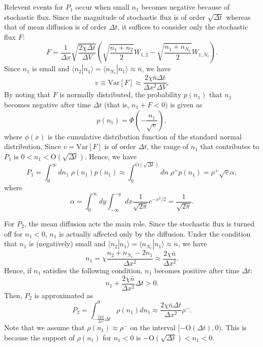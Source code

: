 \documentclass{article}
\begin{document}
Relevent events for $P_1$ occur when small $n_1$ becomes negative because of stochastic flux. 
Since the magnitude of stochastic flux is of order $\sqrt{\Delta t}$ whereas that of mean diffusion is of order $\Delta t$, it suffices to consider only the stochastic flux $F$:
\begin{equation}
F=\frac{1}{\Delta x}\sqrt{\frac{2\chi\Delta t}{\Delta V}}\left(\sqrt{\frac{n_1+n_2}{2}}W_{1,2}-\sqrt{\frac{n_1+n_{N_\mathrm{c}}}{2}}W_{1,N_\mathrm{c}}\right).
\end{equation}
Since $n_1$ is small and $\langle n_2|n_1\rangle = \langle n_{N_\mathrm{c}}|n_1\rangle \approx \bar{n}$, we have
\begin{equation}
v\equiv\mathrm{Var}[F] \approx \frac{2\chi\bar{n}\Delta t}{\Delta x^2\Delta V}.
\end{equation}
By noting that $F$ is normally distributed, the probability $p(n_1)$ that $n_1$ becomes negative after time $\Delta t$ (that is, $n_1+F<0$) is given as
\begin{equation}
p(n_1)=\Phi\left(-\frac{n_1}{\sqrt{v}}\right),
\end{equation}
where $\phi(x)$ is the cumulative distribution function of the standard normal distribution.
Since $v=\mathrm{Var}[F]$ is of order $\Delta t$, the range of $n_1$ that contributes to $P_1$ is $0<n_1<\mathrm{O}(\sqrt{\Delta t})$.
Hence, we have
\begin{equation}
\label{P1}
P_1 = \int_0^\infty dn_1\; \rho(n_1)p(n_1)\approx \int_0^{\mathrm{O}(\sqrt{\Delta t})}dn\; \rho^+ p(n_1) = \rho^+ \sqrt{v}\alpha,
\end{equation}
where
\begin{equation}
\alpha = \int_0^\infty dy \int_{-\infty}^{-y}dx\frac{1}{\sqrt{2\pi}}e^{-x^2/2}=\frac{1}{\sqrt{2\pi}}.
\end{equation}

For $P_2$, the mean diffusion acts the main role.
Since the stochastic flux is turned off for $n_1<0$, $n_1$ is actually affected only by the diffusion.
Under the condition that $n_1$ is (negatively) small and $\langle n_2|n_1\rangle = \langle n_{N_\mathrm{c}}|n_1\rangle \approx \bar{n}$, we have
\begin{equation}
\dot{n}_1 = \chi\frac{n_2+n_{N_\mathrm{c}}-2n_1}{\Delta x^2}\approx\frac{2\chi\bar{n}}{\Delta x^2}.
\end{equation}
Hence, if $n_1$ satisfies the following condition, $n_1$ becomes positive after time $\Delta t$: 
\begin{equation}
n_1+\frac{2\chi\bar{n}}{\Delta x^2}\Delta t>0.
\end{equation}
Then, $P_2$ is approximated as
\begin{equation}
\label{P2}
P_2 = \int_{-\frac{2\chi\bar{n}}{\Delta x^2}\Delta t}^0 \rho(n_1) dn_1 \approx \frac{2\chi\bar{n}\Delta t}{\Delta x^2}\rho^-.
\end{equation}
Note that we assume that $\rho(n_1)\approx \rho^-$ on the interval $[-\mathrm{O}(\Delta t),0)$.
This is because the support of $\rho(n_1)$ for $n_1<0$ is $-\mathrm{O}(\sqrt{\Delta t})<n_1<0$.
\end{document}
